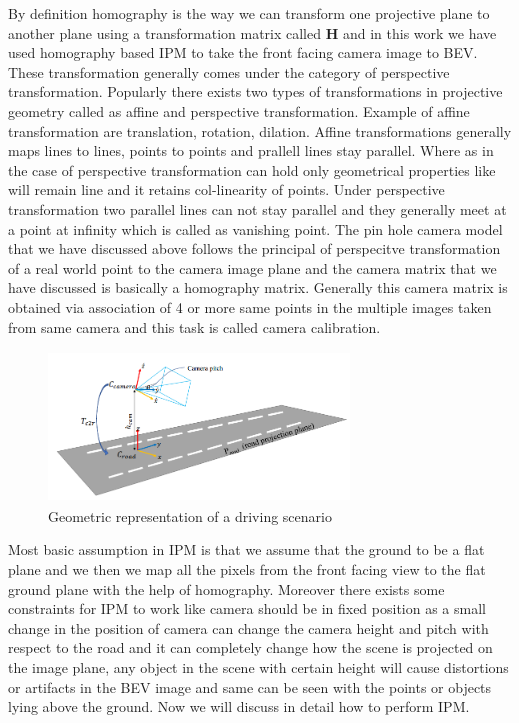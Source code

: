      By definition homography is the way we can transform one projective plane to another plane using a transformation matrix called \textbf{H} and in this work we have used homography based IPM to take the front facing camera image to BEV. These transformation generally comes under the category of perspective transformation. Popularly there exists two types of transformations in projective geometry called as affine and perspective transformation. Example of affine transformation are translation, rotation, dilation. Affine transformations generally maps lines to lines, points to points and prallell lines stay parallel. Where as in the case of perspective transformation can hold only geometrical properties like will remain line and it retains col-linearity of points. Under perspective transformation two parallel lines can not stay parallel and they generally meet at a point at infinity which is called as vanishing point. The pin hole camera model that we have discussed above follows the principal of perspecitve transformation of a real world point to the camera image plane and the camera matrix that we have discussed is basically a homography matrix. Generally this camera matrix is obtained via association of 4 or more same points in the multiple images taken from same camera and this task is called camera calibration. 
     
            \begin{figure}[h]
    \centering
    \includegraphics[width=8cm, height =4cm]{images/camera_geometry_lane_detection.png}
    \caption{ Geometric representation of a driving scenario \cite{DBLP:journals/corr/abs-1811-10203}}
    \end{figure}
    
     Most basic assumption in IPM is that we assume that the ground to be a flat plane and we then we map all the pixels from the front facing view to the flat ground plane with the help of homography. Moreover there exists some constraints for IPM to work like camera should be in fixed position as a small change in the position of camera can change the camera height and pitch with respect to the road and it can completely change how the scene is projected on the image plane, any object in the scene with certain height will cause distortions or artifacts in the BEV image and same can be seen with the points or objects lying above the ground. Now we will discuss in detail how to perform IPM. 
     
